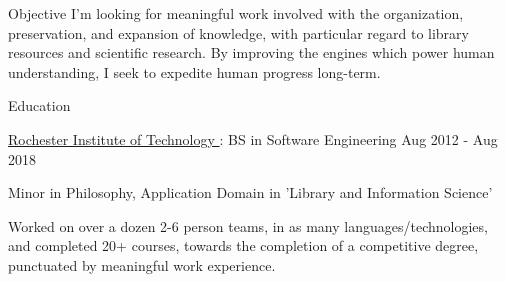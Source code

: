 \documentclass{resume} %
\begin{document}
  \begin{rSection}{Objective}
    I'm looking for meaningful work involved with the organization, preservation, and expansion of knowledge, with particular regard to library resources and scientific research. By improving the engines which power human understanding, I seek to expedite human progress long-term.
  \end{rSection}

  \begin{rSection}{Education}

    \begin{rSubsection}{\underline{Rochester Institute of Technology }: BS in Software Engineering }{ Aug 2012 - Aug 2018 }{}

      \item Minor in Philosophy, Application Domain in 'Library and Information Science'

      \item Worked on over a dozen 2-6 person teams, in as many languages/technologies, and completed 20+ courses, towards the completion of a competitive degree, punctuated by meaningful work experience.

    \end{rSubsection}

  \end{rSection}
\end{document}
